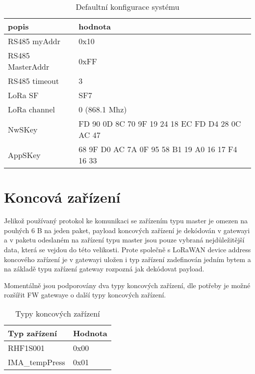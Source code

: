 \begin{table}[!h]
    \centering
    \begin{tabular}{ |l|l| }
     \hline

     popis              & hodnota         \\ \hline \hline
     RS485 myAddr       & 0x10            \\ \hline
     RS485 MasterAddr   & 0xFF            \\ \hline
     RS485 timeout      & 3               \\ \hline
     LoRa SF            & SF7             \\ \hline
     LoRa channel       & 0 (868.1 Mhz)   \\ \hline
     NwSKey             & FD 90 0D 8C 70 9F 19 24 18 EC FD D4 28 0C AC 47  \\ \hline
     AppSKey            & 68 9F D0 AC 7A 0F 95 58 B1 19 A0 16 17 F4 16 33  \\ \hline

    \end{tabular}
    \caption{Defaultní konfigurace systému}
    \label{table:5}
\end{table}


\newpage
\section{Koncová zařízení}
Jelikož používaný protokol ke komunikaci se zařízením typu master je omezen na pouhých 6 B na jeden paket, payload koncových zařízení je dekódován v gatewayi a v paketu odeslaném na zařízení typu master jsou pouze vybraná nejdůležitější data, která se vejdou do této velikosti.
Prote společně s LoRaWAN device address koncového zařízení je v gatewayi uložen i typ zařízení zadefinován jedním bytem a na základě typu zařízení gateway rozpozná jak dekódovat payload.

Momentálně jsou podporovány dva typy koncových zařízení, dle potřeby je možné rozšířit FW gatewaye o další typy koncových zařízení.

\begin{table}[!h]
    \centering
    \begin{tabular}{ |l|l| }
     \hline

     Typ zařízení       & Hodnota         \\ \hline \hline
     RHF1S001           & 0x00            \\ \hline
     IMA\_tempPress     & 0x01            \\ \hline

    \end{tabular}
    \caption{Typy koncových zařízení}
    \label{table:TypyKoncZarizeni}
\end{table}

